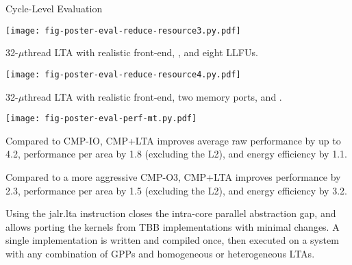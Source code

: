 \documentclass{cbxposter}
\renewcommand{\smallskip}{\vspace{0.16667in}}
\begin{document}
\begin{frame}[fragile,t]{}
\begin{columns}[T]
\begin{column}{10.5in}
\begin{block}{Cycle-Level Evaluation}
\begin{center}
  \vspace{0.3in}
  \texttt{[image: fig-poster-eval-reduce-resource3.py.pdf]}
  \vspace{-0.025in}

  32-$\mu$thread LTA with realistic front-end, , and
  eight LLFUs.

  \vspace{0.3in}
  \texttt{[image: fig-poster-eval-reduce-resource4.py.pdf]}
  \vspace{-0.025in}

  32-$\mu$thread LTA with realistic front-end, two memory ports, and
  .
  \end{center}


  \texttt{[image: fig-poster-eval-perf-mt.py.pdf]}

  Compared to CMP-IO, CMP+LTA improves average raw performance by up to
  4.2\X{}, performance per area by 1.8\X{} (excluding the L2), and energy
  efficiency by 1.1\X{}.

  Compared to a more aggressive CMP-O3, CMP+LTA improves
  performance by 2.3\X{}, performance per area by 1.5\X{}
  (excluding the L2), and energy efficiency by 3.2\X{}.

  \vspace{0.1in}

  Using the jalr.lta instruction closes the intra-core parallel
  abstraction gap, and allows porting the kernels from TBB
  implementations with minimal changes. A single implementation is
  written and compiled once, then executed on a system with any
  combination of GPPs and homogeneous or heterogeneous LTAs.

  \smallskip
\end{block}


\end{column}
\end{columns}
\end{frame}
\end{document}
